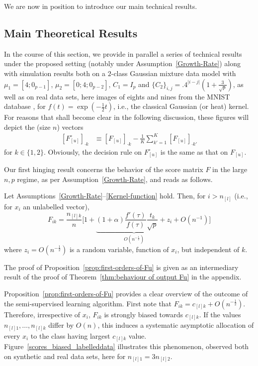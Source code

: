 \documentclass[twoside,11pt]{article}
\def\ftau{f(\tau)}
\def\fftau{f'(\tau)}
\begin{document}
We are now in position to introduce our main technical results.

\subsection{Main Theoretical Results}
\label{sec:results}

In the course of this section, we provide in parallel a series of technical results under the proposed setting (notably under Assumption~\ref{Growth-Rate}) along with simulation results both on a $2$-class Gaussian mixture data model with $\mu_{1}=[4;0_{p-1}]$, $\mu_{2}=[0;4;0_{p-2}]$, $C_1=I_p$ and $\{C_2\}_{i,j}=.4^{\vert i-j\vert}(1+\frac{3}{\sqrt{p}})$, as well as on real data sets, here images of eights and nines from the MNIST database \citep{lecun1998mnist}, for $f(t)=\exp(-\frac12t)$, i.e., the classical Gaussian (or heat) kernel. For reasons that shall become clear in the following discussion, these figures will depict the (size $n$) vectors
\begin{align*}
	\left[F^\circ_{[u]}\right]_{\cdot k} &\equiv \left[F_{[u]}\right]_{\cdot k} - \frac{1}{K}\sum_{k'=1}^K \left[ F_{[u]} \right]_{\cdot k'}
\end{align*}
for $k\in\{1,2\}$. Obviously, the decision rule on $F^\circ_{[u]}$ is the same as that on $F_{[u]}$.

Our first hinging result concerns the behavior of the score matrix $F$ in the large $n,p$ regime, as per Assumption~\ref{Growth-Rate}, and reads as follows. 
\begin{proposition}
	\label{prop:first-orders-of-Fu} Let Assumptions~\ref{Growth-Rate}--\ref{Kernel-function} hold. Then, for $i>n_{[l]}$ (i.e., for $x_i$ an unlabelled vector),
\begin{equation}\label{eq:first-orders}
	F_{ik}=\frac{n_{[l]k}}n\Bigg[1+\underbrace{(1+\alpha)\frac{\fftau}{\ftau}\frac{t_{k}}{\sqrt{p}}+z_{i}}_{O(n^{-\frac{1}{2}})}+O(n^{-1})\Bigg]
\end{equation}
where $z_{i}=O(n^{-\frac12})$ is a random variable, function of $x_i$, but independent of $k$.
\end{proposition}
The proof of Proposition~\ref{prop:first-orders-of-Fu} is given as an intermediary result of the proof of Theorem~\ref{thm:behaviour of output Fu} in the appendix.

Proposition~\ref{prop:first-orders-of-Fu} provides a clear overview of the outcome of the semi-supervised learning algorithm. First note that $F_{ik}=c_{[l]k}+O(n^{-\frac12})$. Therefore, irrespective of $x_i$, $F_{ik}$ is strongly biased towards $c_{[l]k}$. If the values $n_{[l]1},\ldots,n_{[l]k}$ differ by $O(n)$, this induces a systematic asymptotic allocation of every $x_i$ to the class having largest $c_{[l]k}$ value. Figure~\ref{scores_biased_labelleddata} illustrates this phenomenon, observed both on synthetic and real data sets, here for $n_{[l]1}=3n_{[l]2}$. 
\end{document}
